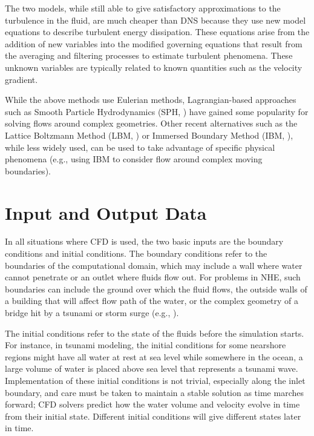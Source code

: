 The two models, while still able to give satisfactory approximations to the turbulence in the fluid, are much cheaper than DNS because they use new model equations to describe turbulent energy dissipation. These equations arise from the addition of new variables into the modified governing equations that result from the averaging and filtering processes to estimate turbulent phenomena. These unknown variables are typically related to known quantities such as the velocity gradient. 

While the above methods use Eulerian methods, Lagrangian-based approaches such as Smooth Particle Hydrodynamics (SPH, \cite{Gingold1977SPH, Lucy1977SPH, Lind2020SPH}) have gained some popularity  for solving flows around complex geometries.  Other recent alternatives such as the Lattice Boltzmann Method (LBM, \cite{Chen1998LBM}) or Immersed Boundary Method (IBM,  \cite{Peskin1972IBM, Peskin1977IBM, Peskin2002IBM}), while less widely used, can be used to take advantage of specific physical phenomena (e.g., using IBM to consider flow around complex moving boundaries).  
 
\section{Input and Output Data}
\label{sec:resp_cfd_water_io}

In all situations where CFD is used, the two basic inputs are the boundary conditions and initial conditions. The boundary conditions refer to the boundaries of the computational domain, which may include a wall where water cannot penetrate or an outlet where fluids flow out. For problems in NHE, such boundaries can include the ground over which the fluid flows, the outside walls of a building that will affect flow path of the water, or the complex geometry of a bridge hit by a tsunami or storm surge (e.g., \cite{giles1990nonreflecting, miquel2018analysis}). 

The initial conditions refer to the state of the fluids before the simulation starts. For instance, in tsunami modeling, the initial conditions for some nearshore regions might have all water at rest at sea level while somewhere in the ocean, a large volume of water is placed above sea level that represents a tsunami wave. Implementation of these initial conditions is not trivial, especially along the inlet boundary, and care must be taken to maintain a stable solution as time marches forward;  CFD solvers predict how the water volume and velocity evolve in time from their initial state. Different initial conditions will give different states later in time.

